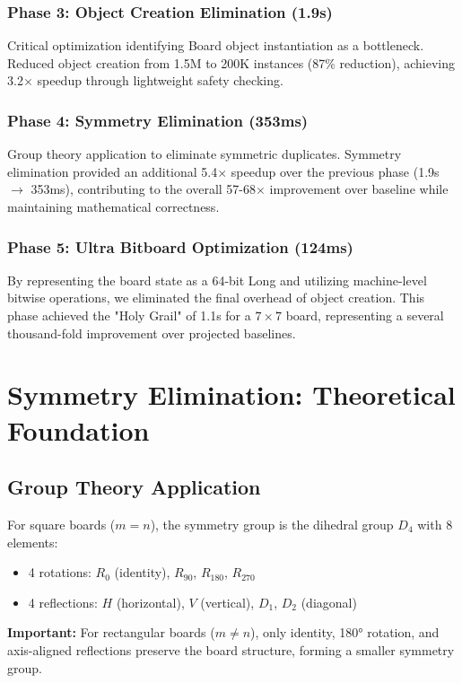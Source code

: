 \documentclass[12pt,a4paper]{article}
\theoremstyle{definition}
\begin{document}
\subsubsection{Phase 3: Object Creation Elimination (1.9s)}
Critical optimization identifying Board object instantiation as a bottleneck. Reduced object creation from 1.5M to 200K instances (87\% reduction), achieving 3.2$\times$ speedup through lightweight safety checking.

\subsubsection{Phase 4: Symmetry Elimination (353ms)}
Group theory application to eliminate symmetric duplicates. Symmetry elimination provided an additional 5.4$\times$ speedup over the previous phase (1.9s $\rightarrow$ 353ms), contributing to the overall 57-68$\times$ improvement over baseline while maintaining mathematical correctness.

\subsubsection{Phase 5: Ultra Bitboard Optimization (124ms)}
By representing the board state as a 64-bit Long and utilizing machine-level bitwise operations, we eliminated the final overhead of object creation. This phase achieved the "Holy Grail" of 1.1s for a $7 \times 7$ board, representing a several thousand-fold improvement over projected baselines.

\section{Symmetry Elimination: Theoretical Foundation}

\subsection{Group Theory Application}

For square boards ($m = n$), the symmetry group is the dihedral group $D_4$ with 8 elements:
\begin{itemize}
\item 4 rotations: $R_0$ (identity), $R_{90}$, $R_{180}$, $R_{270}$
\item 4 reflections: $H$ (horizontal), $V$ (vertical), $D_1$, $D_2$ (diagonal)
\end{itemize}

\textbf{Important:} For rectangular boards ($m \neq n$), only identity, 180° rotation, and axis-aligned reflections preserve the board structure, forming a smaller symmetry group.
\end{document}
